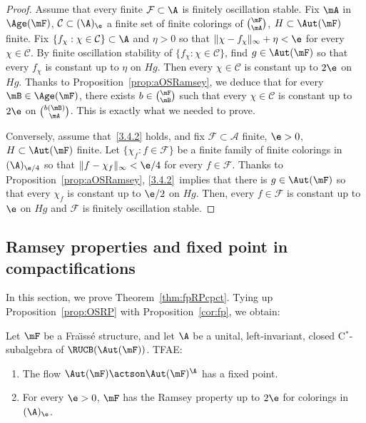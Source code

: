 \begin{proof}
Assume that every finite $\mathcal F\subset \A$ is finitely oscillation stable. Fix $\mA$ in $\Age(\mF)$, $\mathcal C \subset (\A)_{\e}$ a finite set of finite colorings of $\binom{\mF}{\mA}$, $H\subset \Aut(\mF)$ finite. Fix $\{ f_{\chi}: \chi\in \mathcal C\}\subset \A$ and $\eta >0$ so that $\| \chi - f_{\chi}\|_{\infty}+\eta<\e$ for every $\chi \in \mathcal C$. By finite oscillation stability of $\{ f_{\chi}: \chi\in \mathcal C\}$, find $g\in \Aut(\mF)$ so that every $f_{\chi}$ is constant up to $\eta$ on $Hg$. Then every $\chi \in \mathcal C$ is constant up to $2\e$ on $Hg$. Thanks to Proposition~\ref{prop:aOSRamsey}, we deduce that for every $\mB \in \Age(\mF)$, there exists $b\in \binom{\mF}{\mB}$ such that every $\chi\in \mathcal C$ is constant up to $2\e$ on $\binom{b(\mB)}{\mA}$. This is exactly what we needed to prove.

Conversely, assume that~\eqref{3.4.2} holds, and fix $\mathcal F\subset \mathcal A$ finite, $\e>0$, $H\subset \Aut(\mF)$ finite. Let $\{ \chi_{f} : f\in \mathcal F\}$ be a finite family of finite colorings in $(\A)_{\e/4}$ so that $\| f-\chi_{f}\|_{\infty}<\e/4$ for every $f\in \mathcal F$. Thanks to Proposition~\ref{prop:aOSRamsey}, \eqref{3.4.2}~implies that there is $g\in \Aut(\mF)$ so that every $\chi_{f}$ is constant up to $\e/2$ on $Hg$. Then, every $f\in \mathcal F$ is constant up to $\e$ on $Hg$ and $\mathcal F$ is finitely oscillation stable.
\end{proof}

\subsection{Ramsey properties and fixed point in compactifications}

In this section, we prove Theorem~\ref{thm:fpRPcpct}. Tying up Proposition~\ref{prop:OSRP} with Proposition~\ref{cor:fp}, we obtain:

\begin{prop}\label{cor:fpaRP}
Let $\mF$ be a Fra\"{\i}ss\'e structure, and let $\A$ be a unital, left-invariant, closed C$^{*}$-subalgebra of $\RUCB(\Aut(\mF))$. TFAE:
\begin{enumerate}
\item \label{3.5.1} The flow $\Aut(\mF)\actson \Aut(\mF)^{\A}$ has a fixed point.
\item \label{3.5.2} For every $\e>0$, $\mF$ has the Ramsey property up to $2\e$ for colorings in $(\A)_{\e}$.
\end{enumerate}
\end{prop}

